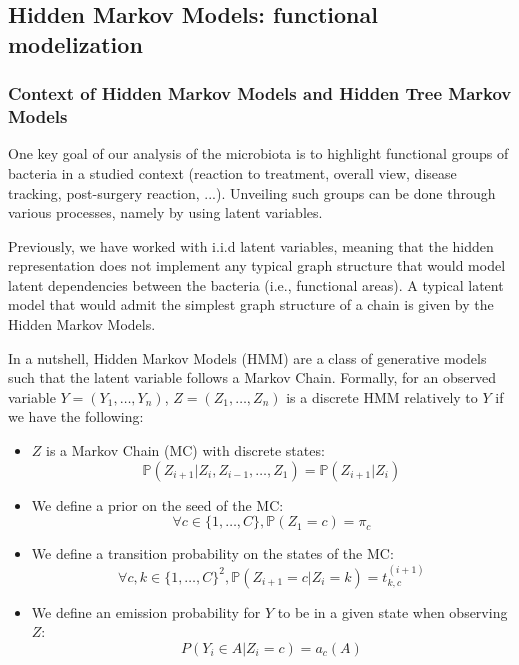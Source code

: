 \subsection{Hidden Markov Models: functional modelization}

\subsubsection{Context of Hidden Markov Models and Hidden Tree Markov Models}

One key goal of our analysis of the microbiota is to highlight functional groups of
bacteria in a studied context (reaction to treatment, overall view, disease tracking, post-surgery reaction, ...).
Unveiling such groups can be done through various processes, namely by using latent variables.

\medskip

Previously, we have worked with i.i.d latent variables, meaning that the hidden representation does not
implement any typical graph structure that would model latent dependencies between the bacteria (i.e., functional areas).
A typical latent model that would admit the simplest graph structure of a chain is given by the Hidden Markov Models.

\medskip

In a nutshell, Hidden Markov Models (HMM) are a class of generative models such that the latent variable follows a Markov Chain.
Formally, for an observed variable $Y = (Y_1, \dots, Y_n)$, $Z = (Z_1, \dots, Z_n)$ is a discrete HMM relatively to $Y$ if we have the following:
\begin{itemize}
    \item $Z$ is a Markov Chain (MC) with discrete states:
         $$
         \mathbb{P}(Z_{i+1} | Z_i, Z_{i-1}, \dots, Z_1) = \mathbb{P}(Z_{i+1} | Z_i)
         $$
    \item We define a prior on the seed of the MC:
         $$\forall c \in \{1, \dots, C\}, \mathbb{P}(Z_1 = c) = \pi_c$$

    \item We define a transition probability on the states of the MC:
        $$\forall c,k \in \{1, \dots, C\}^2, \mathbb{P}(Z_{i+1} = c | Z_i = k) = t_{k,c}^{(i+1)}$$

    \item We define an emission probability for $Y$ to be in a given state when observing $Z$:
        $$
        P(Y_i \in A | Z_i = c) = a_c(A)
        $$
\end{itemize}

